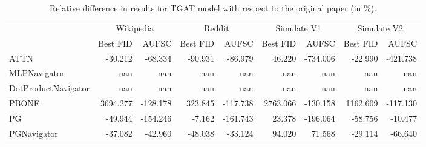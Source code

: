 \begin{table}
\centering
\begin{tabular}{lrrrrrrrr}
\toprule
 & \multicolumn{2}{c}{Wikipedia} & \multicolumn{2}{c}{Reddit} & \multicolumn{2}{c}{Simulate V1} & \multicolumn{2}{c}{Simulate V2} \\
 & Best FID & AUFSC & Best FID & AUFSC & Best FID & AUFSC & Best FID & AUFSC \\
\midrule
ATTN & -30.212 & -68.334 & -90.931 & -86.979 & 46.220 & -734.006 & -22.990 & -421.738 \\
MLPNavigator & nan & nan & nan & nan & nan & nan & nan & nan \\
DotProductNavigator & nan & nan & nan & nan & nan & nan & nan & nan \\
PBONE & 3694.277 & -128.178 & 323.845 & -117.738 & 2763.066 & -130.158 & 1162.609 & -117.130 \\
PG & -49.944 & -154.246 & -7.162 & -161.743 & 23.378 & -196.064 & -58.756 & -10.477 \\
PGNavigator & -37.082 & -42.960 & -48.038 & -33.124 & 94.020 & 71.568 & -29.114 & -66.640 \\
\bottomrule
\end{tabular}
\caption{\label{tab:tgat_results_diff}Relative difference in results for TGAT model with respect to the original paper (in \%).}
\end{table}
